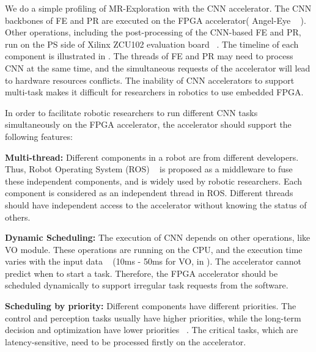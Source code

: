 
We do a simple profiling of MR-Exploration with the CNN accelerator. The CNN backbones of FE and  PR are executed on the FPGA accelerator( Angel-Eye ~\cite{guo2017angel} ).
Other operations, including the post-processing of the CNN-based FE and PR, run on the PS side of Xilinx ZCU102 evaluation board ~\cite{zcu102}. The timeline of each component is illustrated in . 
The threads of FE and PR may need to process CNN at the same time,  and the simultaneous requests of the accelerator will lead to hardware resources conflicts. The inability of CNN accelerators to support multi-task makes it difficult for researchers in robotics to use embedded FPGA.

In order to facilitate robotic researchers to run different CNN tasks simultaneously on the FPGA accelerator, the accelerator should support the following features:

\textbf{Multi-thread:} Different components in a robot are from different developers. Thus, Robot Operating System (ROS)  ~\cite{quigley2009ros} is proposed as a middleware to fuse these independent components, and is widely used by robotic researchers. Each component is considered as an independent thread in ROS. Different threads should have independent access to the accelerator without knowing the status of others.



\textbf{Dynamic Scheduling:} The execution of CNN depends on other operations, like VO module. 
These operations are running on the CPU, and the execution time varies with the input data  ~\cite{mohanan2018survey} (10ms - 50ms for VO, in ). 
The accelerator cannot predict when to start a task. 
Therefore, the FPGA accelerator should be scheduled dynamically to support irregular task requests from the software.

\textbf{Scheduling by priority:} Different components have different priorities. The control and perception tasks usually have higher priorities, while the long-term decision and optimization have lower priorities  ~\cite{RamsauerKLM17}. The critical tasks, which are latency-sensitive,  need to be processed firstly on the accelerator.

